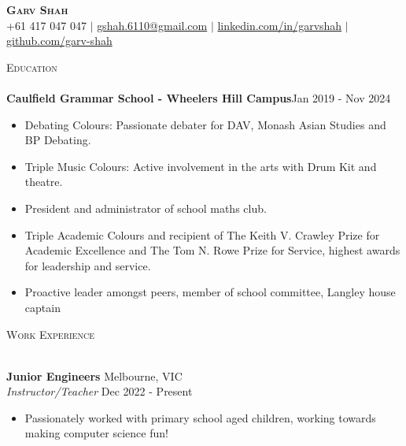 \documentclass[a4paper]{article}
\newcommand{\lineunder} {
    \vspace*{-8pt} \\
    \hspace*{-18pt} \hrulefill \\
}
\newcommand{\header} [1] {
    {\hspace*{-18pt}\vspace*{6pt} \textsc{#1}}
    \vspace*{-6pt} \lineunder
}
\begin{document}
\vspace*{-40pt}



\vspace*{-20pt}

\begin{center}
    \textbf{\Huge \scshape Garv Shah} \\ \vspace{1pt}
    \small +61 417 047 047 $|$ \href{mailto:gshah.6110@gmail.com}{gshah.6110@gmail.com} $|$
    \href{https://www.linkedin.com/in/garvshah/}{linkedin.com/in/garvshah} $|$
    \href{https://garv-shah.github.io/}{github.com/garv-shah}
\end{center}
\vspace{-2mm}

\header{Education}
\textbf{Caulfield Grammar School - Wheelers Hill Campus}\hfill Jan 2019 - Nov 2024\\
\begin{itemize} \itemsep 1pt
	\item Debating Colours: Passionate debater for DAV, Monash Asian Studies and BP Debating.
        \item Triple Music Colours: Active involvement in the arts with Drum Kit and theatre.
        \item President and administrator of school maths club.
        \item Triple Academic Colours and recipient of The Keith V. Crawley Prize for Academic Excellence and The Tom N. Rowe Prize for Service, highest awards for leadership and service.
        \item Proactive leader amongst peers, member of school committee, Langley house captain
\end{itemize}

\header{Work Experience}
\vspace{1mm}

\textbf{Junior Engineers} \hfill Melbourne, VIC\\
\textit{Instructor/Teacher} \hfill Dec 2022 - Present\\
\vspace{-3mm}
\begin{itemize} \itemsep 0.5pt
    \item Passionately worked with primary school aged children, working towards making computer science fun!
\end{itemize}
\vspace{-2mm}
\end{document}

